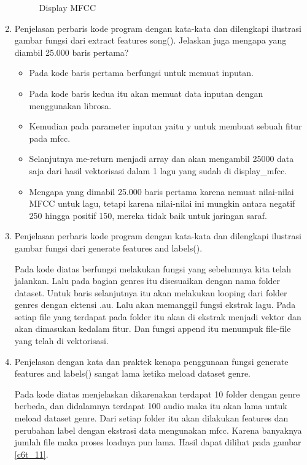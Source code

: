 \begin{enumerate}
\begin{figure}[!htbp]
\caption{Display MFCC}
\label{c6t_10}
\end{figure} 
\item Penjelasan perbaris kode program dengan kata-kata dan dilengkapi ilustrasi gambar fungsi dari extract features song(). Jelaskan juga mengapa yang diambil 25.000 baris pertama?

\begin{itemize}
\item Pada kode baris pertama berfungsi untuk memuat inputan. 
\item Pada kode baris kedua itu akan memuat data inputan dengan menggunakan librosa.
\item Kemudian pada parameter inputan yaitu y untuk membuat sebuah fitur pada mfcc.
\item Selanjutnya me-return menjadi array dan akan mengambil 25000 data saja dari hasil vektorisasi dalam 1 lagu yang sudah di display\_mfcc.  
\item Mengapa yang dimabil 25.000 baris pertama karena nemuat nilai-nilai MFCC untuk lagu, tetapi karena nilai-nilai ini mungkin antara negatif 250 hingga positif 150, mereka tidak baik untuk jaringan saraf.
\end{itemize}
\item Penjelasan perbaris kode program dengan kata-kata dan dilengkapi ilustrasi gambar fungsi dari generate features and labels().

\subitem Pada kode diatas berfungsi melakukan fungsi yang sebelumnya kita telah jalankan. Lalu pada bagian genres itu disesuaikan dengan nama folder dataset. Untuk baris selanjutnya itu akan melakukan looping dari folder genres dengan ektensi .au. Lalu akan memanggil fungsi ekstrak lagu. Pada setiap file yang terdapat pada folder itu akan di ekstrak menjadi vektor dan akan dimasukan kedalam fitur. Dan fungsi append itu menumpuk file-file yang telah di vektorisasi.
\item Penjelasan dengan kata dan praktek kenapa penggunaan fungsi generate features and labels() sangat lama ketika meload dataset genre.

\subitem Pada kode diatas menjelaskan dikarenakan terdapat 10 folder dengan genre berbeda, dan didalamnya terdapat 100 audio maka itu akan lama untuk meload dataset genre. Dari setiap folder itu akan dilakukan features dan perubahan label dengan ekstrasi data mengunakan mfcc. Karena banyaknya jumlah file maka proses loadnya pun lama. Hasil dapat dilihat pada gambar \ref{c6t_11}.

\end{enumerate}
